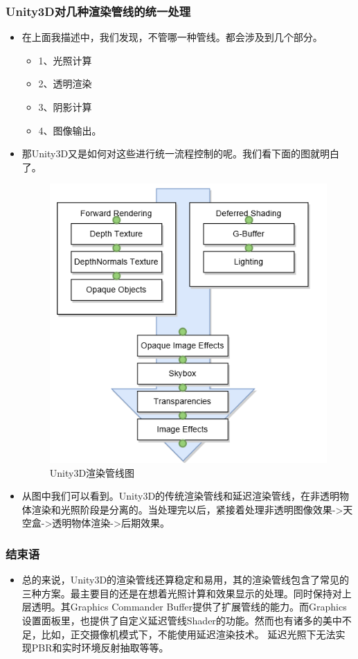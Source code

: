 \documentclass[9pt, b5paper]{article}
\begin{document}
\subsubsection{Unity3D对几种渲染管线的统一处理}
\label{sec:orga626f98}
\begin{itemize}
\item 在上面我描述中，我们发现，不管哪一种管线。都会涉及到几个部分。 
\begin{itemize}
\item 1、光照计算
\item 2、透明渲染
\item 3、阴影计算
\item 4、图像输出。
\end{itemize}
\item 那Unity3D又是如何对这些进行统一流程控制的呢。我们看下面的图就明白了。

\begin{figure}[htbp]
\centering
\includegraphics[width=.9\linewidth]{./pic/rendering.png}
\caption{Unity3D渲染管线图}
\end{figure}
\item 从图中我们可以看到。Unity3D的传统渲染管线和延迟渲染管线，在非透明物体渲染和光照阶段是分离的。当处理完以后，紧接着处理非透明图像效果->天空盒->透明物体渲染->后期效果。
\end{itemize}
\subsubsection{结束语}
\label{sec:orgbda4016}
\begin{itemize}
\item 总的来说，Unity3D的渲染管线还算稳定和易用，其的渲染管线包含了常见的三种方案。最主要目的还是在想着光照计算和效果显示的处理。同时保持对上层透明。其Graphics Commander Buffer提供了扩展管线的能力。而Graphics设置面板里，也提供了自定义延迟管线Shader的功能。然而也有诸多的美中不足，比如，正交摄像机模式下，不能使用延迟渲染技术。 延迟光照下无法实现PBR和实时环境反射抽取等等。
\end{itemize}
\end{document}
